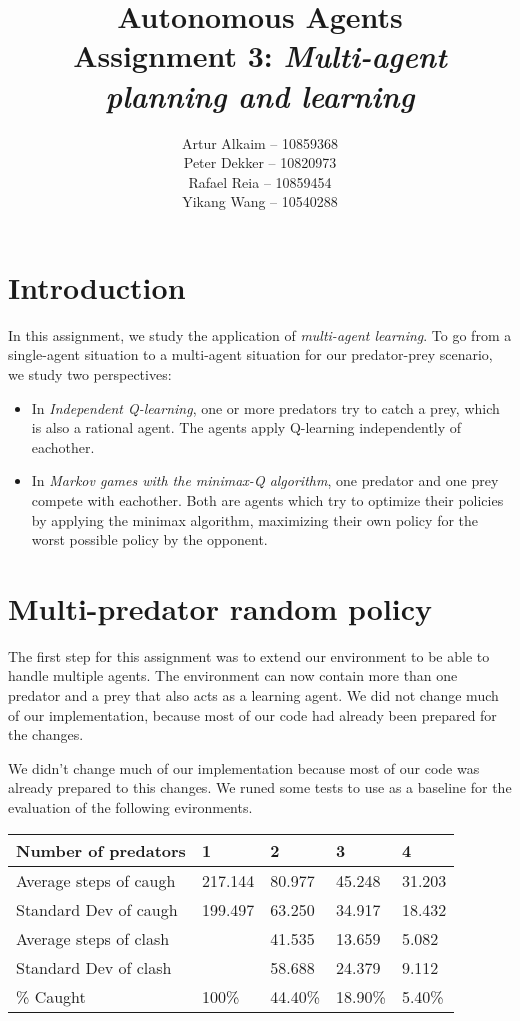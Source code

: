 \documentclass{article}
\begin{document}
\title{Autonomous Agents\\
Assignment 3: \emph{Multi-agent planning and learning}}
\author{
Artur Alkaim -- 10859368\\
Peter Dekker -- 10820973\\
Rafael Reia -- 10859454\\
Yikang Wang -- 10540288\\
}
\maketitle
\section{Introduction}
In this assignment, we study the application of \emph{multi-agent learning}. To go from a single-agent situation to a multi-agent situation for our predator-prey scenario, we study two perspectives:

\begin{itemize}
 \item In \emph{Independent Q-learning}, one or more predators try to catch a prey, which is also a rational agent. The agents apply Q-learning independently of eachother.
 \item In \emph{Markov games with the minimax-Q algorithm}, one predator and one prey compete with eachother. Both are agents which try to optimize their policies by applying the minimax algorithm, maximizing their own policy for the worst possible policy by the opponent.
\end{itemize}
\section{Multi-predator random policy}
The first step for this assignment was to extend our environment to be able to
handle multiple agents. The environment can now contain more than one predator and a prey that also acts as a learning agent.
We did not change much of our implementation, because most of our code had
already been prepared for the changes.

We didn't change much of our implementation because most of our code was
already prepared to this changes. We runed some tests to use as a baseline for
the evaluation of the following evironments.

\begin{table}[h]
\begin{tabular}{|l|l|l|l|l|}
\hline
Number of predators    & 1       & 2       & 3       & 4      \\ \hline
Average steps of caugh & 217.144 & 80.977  & 45.248  & 31.203 \\ \hline
Standard Dev of caugh  & 199.497 & 63.250  & 34.917  & 18.432 \\ \hline
Average steps of clash &         & 41.535  & 13.659  & 5.082  \\ \hline
Standard Dev of clash  &         & 58.688  & 24.379  & 9.112  \\ \hline
\% Caught              & 100\%   & 44.40\% & 18.90\% & 5.40\% \\ \hline
\end{tabular}
\end{table}
\end{document}
